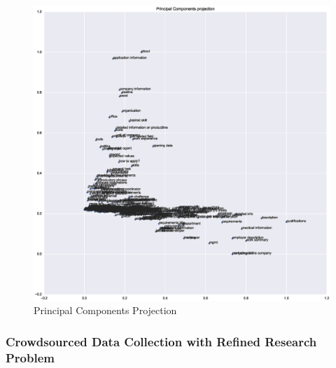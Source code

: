 \begin{figure}[h]
    \centering
    \includegraphics[width=\textwidth]{img/paragraph-data-principal-components-projection.eps}
    \caption{Principal Components Projection}
  \label{fig:paragraph-data-principal-components-projection}
\end{figure}

\subsubsection{Crowdsourced Data Collection with Refined Research Problem}


